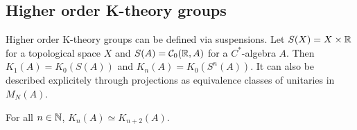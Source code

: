 \subsection{Higher order K-theory groups}
Higher order K-theory groups can be defined via suspensions. Let $S(X)=X\times\Bbb R$ for a topological space $X$ and $S(A)=\mathcal{C}_0(\Bbb R,A)$ for a $C^\ast$-algebra $A$. Then $K_1(A)=K_0(S(A))$ and $K_n(A)=K_0(S^n(A))$. It can also be described explicitely through projections as equivalence classes of unitaries in $M_N(A)$. 

\begin{theorem}
 For all $n\in\mathbb{N}$, $K_n(A)\simeq K_{n+2}(A)$.
\end{theorem}
